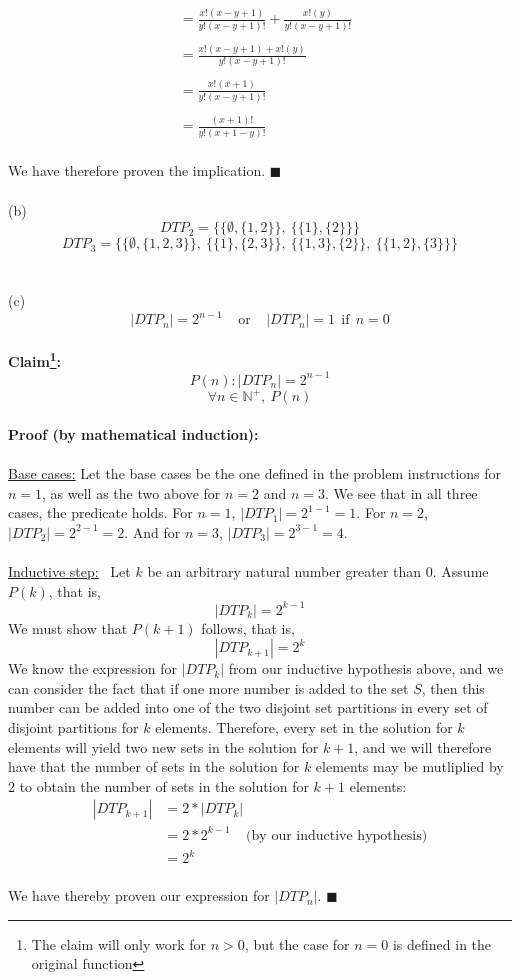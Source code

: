 \documentclass{article}
\newcommand{\N}{\mathbb{N}}
\begin{document}
\begin{enumerate}
\begin{align*}
	 	&= \frac{x!(x-y+1)}{y!(x-y+1)!} + \frac{x!(y)}{y!(x-y+1)!} \\\\
	 	&= \frac{x!(x-y+1) + x!(y)}{y!(x-y+1)!} \\\\
	 	&= \frac{x!(x+1)}{y!(x-y+1)!} \\\\
	 	&= \frac{(x+1)!}{y!(x+1-y)!} 
	 \end{align*} \\
	 We have therefore proven the implication. \null\hfill $\blacksquare$ \\\\
	
	(b) $$DTP_2 = \{\{\emptyset, \{1,2\}\},\ \{\{1\},\{2\}\}\}$$ 
	$$DTP_3 = \{\{\emptyset, \{1,2,3\}\},\ \{\{1\},\{2,3\}\},\ \{\{1,3\},\{2\}\},\ \{\{1,2\},\{3\}\}\}$$ \\\\
	
	(c) $$|DTP_n| = 2^{n-1}\ \ \ \ \ \textrm{or}\ \ \ \ \ |DTP_n| = 1\ \  \textrm{if}\ \ n = 0$$ \\
	\textbf{Claim\footnote{The claim will only work for $n>0$, but the case for $n=0$ is defined in the original function}:}\ 
	$$P(n): |DTP_n| = 2^{n-1}$$  $$\forall n \in \N^+,\ P(n)$$ \\
	\textbf{Proof (by mathematical induction):} \\\\
	\underline{Base cases:} Let the base cases be the one defined in the problem instructions for $n=1$, as well as the two above for $n=2$ and $n=3$. We see that in all three cases, the predicate holds. For $n=1$, $|DTP_1| = 2^{1-1} = 1$. For $n=2$, $|DTP_2| = 2^{2-1} = 2$. And for $n=3$, $|DTP_3| = 2^{3-1} = 4$. \\\\
	\underline{Inductive step:} \ Let $k$ be an arbitrary natural number greater than 0. Assume $P(k)$, that is, 
	$$|DTP_k| = 2^{k-1}$$
	We must show that $P(k+1)$ follows, that is, $$|DTP_{k+1}| = 2^k$$
	We know the expression for $|DTP_k|$ from our inductive hypothesis above, and we can consider the fact that if one more number is added to the set $S$, then this number can be added into one of the two disjoint set partitions in every set of disjoint partitions for $k$ elements. Therefore, every set in the solution for $k$ elements will yield two new sets in the solution for $k+1$, and we will therefore have that the number of sets in the solution for $k$ elements may be mutliplied by 2 to obtain the number of sets in the solution for $k+1$ elements: \\
	\begin{align*}
		|DTP_{k+1}| &= 2 * |DTP_k| \\
		&= 2 * 2^{k-1} \ \ \ \ \ \textrm{(by our inductive hypothesis)}\\
		&= 2^k
	\end{align*} \\
	We have thereby proven our expression for $|DTP_n|$. \null\hfill $\blacksquare$  \\
	

\end{enumerate}
\end{document}
